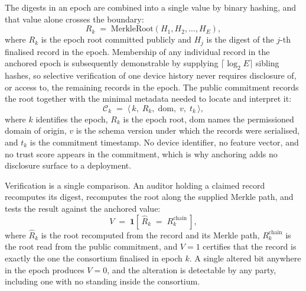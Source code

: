 The digests in an epoch are combined into a single value by binary hashing, and that value alone crosses the boundary:
\begin{equation}
\label{eq:merkle-root}
R_k \;=\; \mathrm{MerkleRoot}\!\left(H_1, H_2, \ldots, H_E\right) ,
\end{equation}
where $R_k$ is the epoch root committed publicly and $H_j$ is the digest of the $j$-th finalised record in the epoch. Membership of any individual record in the anchored epoch is subsequently demonstrable by supplying $\lceil \log_2 E \rceil$ sibling hashes, so selective verification of one device history never requires disclosure of, or access to, the remaining records in the epoch. The public commitment records the root together with the minimal metadata needed to locate and interpret it:
\begin{equation}
\label{eq:anchor-tuple}
\mathcal{C}_k \;=\; \big\langle \, k, \; R_k, \; \mathrm{dom}, \; v, \; t_k \, \big\rangle ,
\end{equation}
where $k$ identifies the epoch, $R_k$ is the epoch root, $\mathrm{dom}$ names the permissioned domain of origin, $v$ is the schema version under which the records were serialised, and $t_k$ is the commitment timestamp. No device identifier, no feature vector, and no trust score appears in the commitment, which is why anchoring adds no disclosure surface to a deployment.

Verification is a single comparison. An auditor holding a claimed record recomputes its digest, recomputes the root along the supplied Merkle path, and tests the result against the anchored value:
\begin{equation}
\label{eq:anchor-verify}
V \;=\; \mathbf{1}\!\left[\, \hat{R}_k \;=\; R_k^{\mathrm{chain}} \,\right] ,
\end{equation}
where $\hat{R}_k$ is the root recomputed from the record and its Merkle path, $R_k^{\mathrm{chain}}$ is the root read from the public commitment, and $V = 1$ certifies that the record is exactly the one the consortium finalised in epoch $k$. A single altered bit anywhere in the epoch produces $V = 0$, and the alteration is detectable by any party, including one with no standing inside the consortium.

